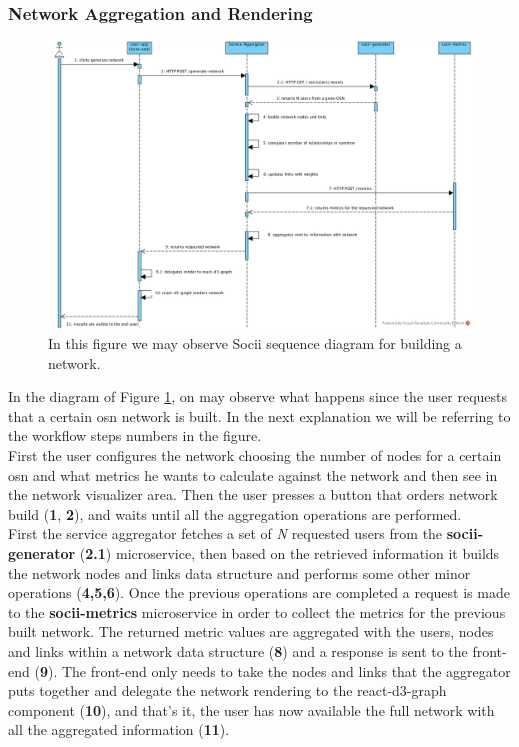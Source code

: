 \subsubsection{Network Aggregation and Rendering}

\begin{figure}[h!]
\begin{center}
  \hspace*{-0.8in}
  \includegraphics[width=1.2\textwidth]{img/socii-sd.jpg}
\end{center}
\caption{\label{img:sociisd} In this figure we may observe Socii sequence diagram for building a network.}
\end{figure}

In the diagram of Figure \ref{img:sociisd}, on may observe what happens since the user requests that a certain \gls{osn} network is built. In the next explanation we will be referring to the workflow steps numbers in the figure.\\
\indent First the user configures the network choosing the number of nodes for a certain \gls{osn} and what metrics he wants to calculate against the network and then see in the network visualizer area. Then the user presses a button that orders network build (\textbf{1}, \textbf{2}), and waits until all the aggregation operations are performed.\\
\indent First the service aggregator fetches a set of \textit{N} requested users from the \textbf{socii-generator} (\textbf{2.1}) microservice, then based on the retrieved information it builds the network nodes and links data structure and performs some other minor operations (\textbf{4,5,6}). Once the previous operations are completed a request is made to the \textbf{socii-metrics} microservice in order to collect the metrics for the previous built network. The returned metric values are aggregated with the users, nodes and links within a network data structure (\textbf{8}) and a response is sent to the front-end (\textbf{9}). The front-end only needs to take the nodes and links that the aggregator puts together and delegate the network rendering to the react-d3-graph component (\textbf{10}), and that's it, the user has now available the full network with all the aggregated information (\textbf{11}).

